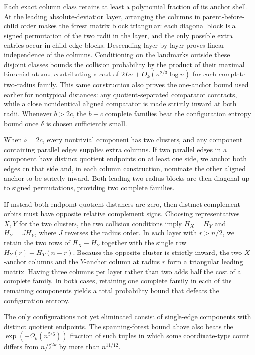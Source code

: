 Each exact column class retains at least a polynomial fraction of its anchor shell. At the leading absolute-deviation layer, arranging the columns in parent-before-child order makes the forest matrix block triangular: each diagonal block is a signed permutation of the two radii in the layer, and the only possible extra entries occur in child-edge blocks. Descending layer by layer proves linear independence of the columns. Conditioning on the landmarks outside these disjoint classes bounds the collision probability by the product of their maximal binomial atoms, contributing a cost of \(2Ln+O_k(n^{2/3}\log n)\) for each complete two-radius family. This same construction also proves the one-anchor bound used earlier for nontypical distances: any quotient-separated comparator contracts, while a close nonidentical aligned comparator is made strictly inward at both radii. Whenever \(b>2c\), the \(b-c\) complete families beat the configuration entropy bound once \(\delta\) is chosen sufficiently small.

When \(b=2c\), every nontrivial component has two clusters, and any component containing parallel edges supplies extra columns. If two parallel edges in a component have distinct quotient endpoints on at least one side, we anchor both edges on that side and, in each column construction, nominate the other aligned anchor to be strictly inward. Both leading two-radius blocks are then diagonal up to signed permutations, providing two complete families.

If instead both endpoint quotient distances are zero, then distinct complement orbits must have opposite relative complement signs. Choosing representatives \(X,Y\) for the two clusters, the two collision conditions imply \(H_X=H_Y\) and \(H_Y=JH_Y\), where \(J\) reverses the radius order. In each layer with \(r>n/2\), we retain the two rows of \(H_X-H_Y\) together with the single row \(H_Y(r)-H_Y(n-r)\). Because the opposite cluster is strictly inward, the two \(X\)-anchor columns and the \(Y\)-anchor column at radius \(r\) form a triangular leading matrix. Having three columns per layer rather than two adds half the cost of a complete family. In both cases, retaining one complete family in each of the remaining components yields a total probability bound that defeats the configuration entropy.

The only configurations not yet eliminated consist of single-edge components with distinct quotient endpoints. The spanning-forest bound above also beats the \(\exp(-\Omega_k(n^{5/6}))\) fraction of such tuples in which some coordinate-type count differs from \(n/2^{2k}\) by more than \(n^{11/12}\).


